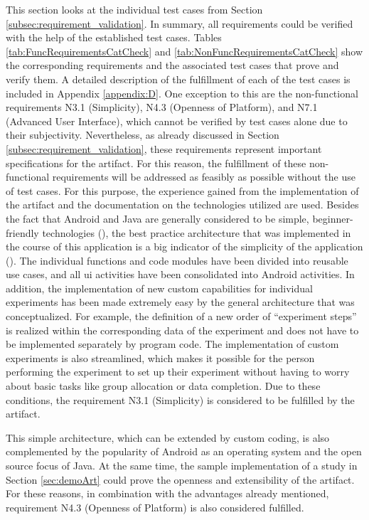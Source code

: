 This section looks at the individual test cases from Section \ref{subsec:requirement_validation}. In summary, all requirements could be verified with the help of the established test cases. Tables \ref{tab:FuncRequirementsCatCheck} and \ref{tab:NonFuncRequirementsCatCheck} show the corresponding requirements and the associated test cases that prove and verify them. A detailed description of the fulfillment of each of the test cases is included in Appendix \ref{appendix:D}. One exception to this are the non-functional requirements N3.1 (Simplicity), N4.3 (Openness of Platform), and N7.1 (Advanced User Interface), which cannot be verified by test cases alone due to their subjectivity. Nevertheless, as already discussed in Section \ref{subsec:requirement_validation}, these requirements represent important specifications for the artifact. For this reason, the fulfillment of these non-functional requirements will be addressed as feasibly as possible without the use of test cases. For this purpose, the experience gained from the implementation of the artifact and the documentation on the technologies utilized are used. Besides the fact that Android and Java are generally considered to be simple, beginner-friendly technologies (\cite{Ullenboom.2017}), the best practice architecture that was implemented in the course of this application is a big indicator of the simplicity of the application (\cite{Google.2023}). The individual functions and code modules have been divided into reusable use cases, and all \ac{ui} activities have been consolidated into Android activities. In addition, the implementation of new custom capabilities for individual experiments has been made extremely easy by the general architecture that was conceptualized. For example, the definition of a new order of \enquote{experiment steps} is realized within the corresponding data of the experiment and does not have to be implemented separately by program code. The implementation of custom experiments is also streamlined, which makes it possible for the person performing the experiment to set up their experiment without having to worry about basic tasks like group allocation or data completion. Due to these conditions, the requirement N3.1 (Simplicity) is considered to be fulfilled by the artifact.

This simple architecture, which can be extended by custom coding, is also complemented by the popularity of Android as an operating system and the open source focus of Java. At the same time, the sample implementation of a study in Section \ref{sec:demoArt} could prove the openness and extensibility of the artifact. For these reasons, in combination with the advantages already mentioned, requirement N4.3 (Openness of Platform) is also considered fulfilled. 

